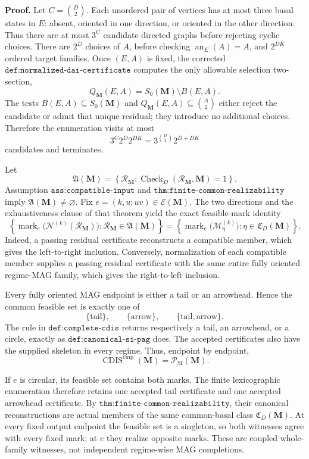 \textbf{Proof.}
Let \(C=\binom D2\).  Each unordered pair of vertices has at most three basal states in \(E\): absent, oriented in one direction, or oriented in the other direction.  Thus there are at most \(3^C\) candidate directed graphs before rejecting cyclic choices.  There are \(2^D\) choices of \(A\), before checking \(\operatorname{an}_E(A)=A\), and \(2^{DK}\) ordered target families.  Once \((E,A)\) is fixed, the corrected \(\texttt{def:normalized-dai-certificate}\) computes the only allowable selection two-section,
\[
Q_{\mathbf M}(E,A)=S_0(\mathbf M)\setminus B(E,A).
\]
The tests \(B(E,A)\subseteq S_0(\mathbf M)\) and \(Q_{\mathbf M}(E,A)\subseteq\binom A2\) either reject the candidate or admit that unique residual; they introduce no additional choices.  Therefore the enumeration visits at most
\[
3^C2^D2^{DK}=3^{\binom D2}2^{D+DK}
\]
candidates and terminates.

Let
\[
\mathfrak A(\mathbf M)
=\left\{\mathcal R_{\mathbf M}:
\operatorname{Check}_{D}(\mathcal R_{\mathbf M},\mathbf M)=1\right\}.
\]
Assumption \(\texttt{ass:compatible-input}\) and \(\texttt{thm:finite-common-realizability}\) imply \(\mathfrak A(\mathbf M)\ne\varnothing\).  Fix \(e=(k,u;uv)\in\mathcal E(\mathbf M)\).  The two directions and the exhaustiveness clause of that theorem yield the exact feasible-mark identity
\[
\left\{
\operatorname{mark}_e\bigl(\mathcal N^{(k)}(\mathcal R_{\mathbf M})\bigr):
\mathcal R_{\mathbf M}\in\mathfrak A(\mathbf M)
\right\}
=
\left\{
\operatorname{mark}_e\bigl(\mathcal M_\eta^{(k)}\bigr):
\eta\in\mathfrak C_D(\mathbf M)
\right\}.
\]
Indeed, a passing residual certificate reconstructs a compatible member, which gives the left-to-right inclusion.  Conversely, normalization of each compatible member supplies a passing residual certificate with the same entire fully oriented regime-MAG family, which gives the right-to-left inclusion.

Every fully oriented MAG endpoint is either a tail or an arrowhead.  Hence the common feasible set is exactly one of
\[
\{\mathrm{tail}\},
\qquad
\{\mathrm{arrow}\},
\qquad
\{\mathrm{tail},\mathrm{arrow}\}.
\]
The rule in \(\texttt{def:complete-cdis}\) returns respectively a tail, an arrowhead, or a circle, exactly as \(\texttt{def:canonical-si-pag}\) does.  The accepted certificates also have the supplied skeleton in every regime.  Thus, endpoint by endpoint,
\[
\operatorname{CDIS}^{\mathrm{cmp}}(\mathbf M)
=\mathcal P_{\mathrm{SI}}(\mathbf M).
\]

If \(e\) is circular, its feasible set contains both marks.  The finite lexicographic enumeration therefore retains one accepted tail certificate and one accepted arrowhead certificate.  By \(\texttt{thm:finite-common-realizability}\), their canonical reconstructions are actual members of the same common-basal class \(\mathfrak C_D(\mathbf M)\).  At every fixed output endpoint the feasible set is a singleton, so both witnesses agree with every fixed mark; at \(e\) they realize opposite marks.  These are coupled whole-family witnesses, not independent regime-wise MAG completions.

